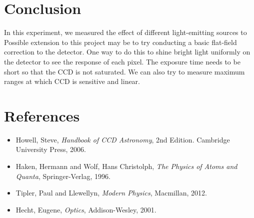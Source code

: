 \documentclass[authoryear, 12pt,5p, times]{elsarticle}
\begin{document}
\section{Conclusion}
In this experiment, we measured the effect of different light-emitting sources to 
Possible extension to this project may be to try conducting a basic flat-field correction to the detector. One way to do this to shine bright light uniformly on the detector to see the response of each pixel. The exposure time needs to be short so that the CCD is not saturated. We can also try to measure maximum ranges at which CCD is sensitive and linear.
\section{References}
%
\begin{itemize}
\item Howell, Steve,  \textit{Handbook of CCD Astronomy}, 2nd Edition. Cambridge University Press, 2006.
\item Haken, Hermann and Wolf, Hans Christolph, \textit{The Physics of Atoms and Quanta}, Springer-Verlag, 1996.
\item Tipler, Paul and Llewellyn, \textit{Modern Physics}, Macmillan, 2012.
\item Hecht, Eugene, \textit{Optics}, Addison-Wesley, 2001.
\end{itemize}
\end{document}
